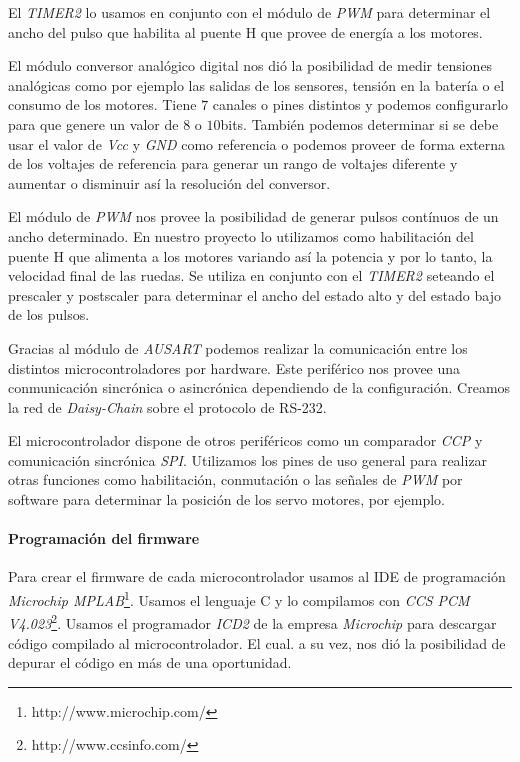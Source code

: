 El \emph{TIMER2} lo usamos en conjunto con el m\'odulo de \emph{PWM} para determinar el ancho del pulso que habilita al puente H
que provee de energ\'ia a los motores.

El m\'odulo conversor anal\'ogico digital nos di\'o la posibilidad de medir tensiones anal\'ogicas como por ejemplo
las salidas de los sensores, tensi\'on en la bater\'ia o el consumo de los motores.
Tiene $7$ canales o pines distintos y podemos configurarlo para que genere un valor de $8$ o $10$bits.
Tambi\'en podemos determinar si se debe usar el valor de \emph{Vcc} y \emph{GND} como referencia o podemos proveer
de forma externa de los voltajes de referencia para generar un rango de voltajes diferente y aumentar o disminuir
as\'i la resoluci\'on del conversor.

El m\'odulo de \emph{PWM} nos provee la posibilidad de generar pulsos cont\'inuos de un ancho determinado.
En nuestro proyecto lo utilizamos como habilitaci\'on del puente H que alimenta a los motores variando as\'i la
potencia y por lo tanto, la velocidad final de las ruedas.
Se utiliza en conjunto con el \emph{TIMER2} seteando el prescaler y postscaler para determinar el ancho del
estado alto y del estado bajo de los pulsos.

Gracias al m\'odulo de \emph{AUSART} podemos realizar la comunicaci\'on entre los distintos microcontroladores por hardware.
Este perif\'erico nos provee una conmunicaci\'on sincr\'onica o asincr\'onica dependiendo de la configuraci\'on.
Creamos la red de \emph{Daisy-Chain} sobre el protocolo de RS-232.

El microcontrolador dispone de otros perif\'ericos como un comparador \emph{CCP} y comunicaci\'on sincr\'onica \emph{SPI}.
Utilizamos los pines de uso general para realizar otras funciones como habilitaci\'on, conmutaci\'on o las se\~nales de
\emph{PWM} por software para determinar la posici\'on de los servo motores, por ejemplo.

\paragraph{Programaci\'on del firmware}
\label{h_controlador_micro_programacion}

Para crear el firmware de cada microcontrolador usamos al IDE de programaci\'on 
\emph{Microchip MPLAB}\footnote{http://www.microchip.com/}.
Usamos el lenguaje C y lo compilamos con \emph{CCS PCM V4.023}\footnote{http://www.ccsinfo.com/}.
Usamos el programador \emph{ICD2} de la empresa \emph{Microchip} para descargar c\'odigo compilado al microcontrolador.
El cual. a su vez, nos di\'o la posibilidad de depurar el c\'odigo en m\'as de una oportunidad.

